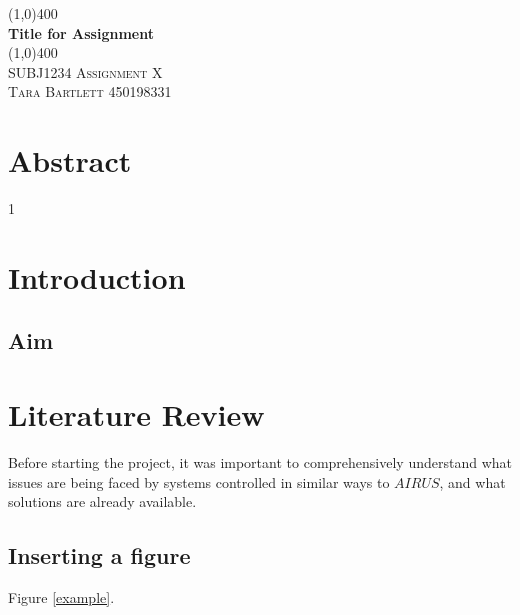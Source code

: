 \documentclass{article}
\begin{document}
\begin{titlepage}
	
\end{titlepage}
\cleardoublepage	
\begin{titlepage}
	\begin{center}
		
		\vspace{2cm}
		\line(1,0){400}\\
		[1cm]
		\huge{\bfseries Title for Assignment}\\
		[2mm]
		\line(1,0){400}\\
		[1.5cm]
		\textsc{\LARGE SUBJ1234 Assignment X}\\
	\vspace{11.75cm}
		\textsc{\large Tara Bartlett 450198331}
	\end{center}
\end{titlepage}


\section*{Abstract}

\newpage
\tableofcontents
\cleardoublepage


\setcounter{page}1

\newpage

\section{Introduction}

\subsection{Aim}

\newpage
\section{Literature Review}
Before starting the project, it was important to comprehensively understand what issues are being faced by systems controlled in similar ways to $AIRUS$, and what solutions are already available.

\subsection{Inserting a figure} Figure \ref{example}.
\end{document}
